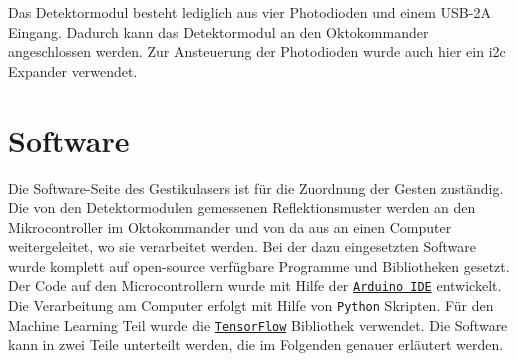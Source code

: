 Das Detektormodul besteht lediglich aus vier Photodioden und einem USB-2A Eingang. Dadurch kann das Detektormodul an den Oktokommander angeschlossen werden. Zur Ansteuerung der Photodioden wurde auch hier ein i2c Expander verwendet. 





\section{Software}
\label{sec:Software}

Die Software-Seite des Gestikulasers ist für die Zuordnung der Gesten zuständig. Die von den Detektormodulen gemessenen Reflektionsmuster werden an den Mikrocontroller im Oktokommander und von da aus an einen Computer weitergeleitet, wo sie verarbeitet werden. Bei der dazu eingesetzten Software wurde komplett auf open-source verfügbare Programme und Bibliotheken gesetzt. Der Code auf den Microcontrollern wurde mit Hilfe der \href{https://www.arduino.cc/en/Main/Software}{\texttt{Arduino IDE}} entwickelt. Die Verarbeitung am Computer erfolgt mit Hilfe von \texttt{Python} Skripten. Für den Machine Learning Teil wurde die \href{https://www.tensorflow.org/}{\texttt{TensorFlow}\texttrademark} Bibliothek verwendet. Die Software kann in zwei Teile unterteilt werden, die im Folgenden genauer erläutert werden.

